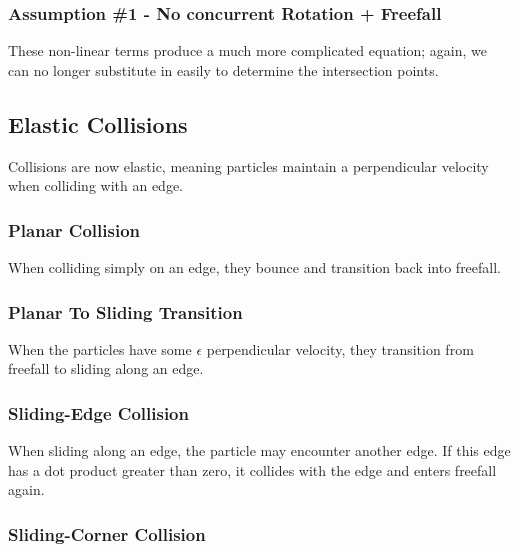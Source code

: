 		\subsubsection{Assumption \#1 - No concurrent Rotation + Freefall}

These non-linear terms produce a much more complicated equation; again, we can no longer substitute in easily to determine the intersection points.


	\subsection{Elastic Collisions}

	Collisions are now elastic, meaning particles maintain a perpendicular velocity when colliding with an edge.

		\subsubsection{Planar Collision}

		When colliding simply on an edge, they bounce and transition back into freefall.


		\subsubsection{Planar To Sliding Transition}

		When the particles have some $\epsilon$ perpendicular velocity, they transition from freefall to sliding along an edge.


		\subsubsection{Sliding-Edge Collision}

		When sliding along an edge, the particle may encounter another edge. If this edge has a dot product greater than zero, it collides with the edge and enters freefall again.


		\subsubsection{Sliding-Corner Collision}

